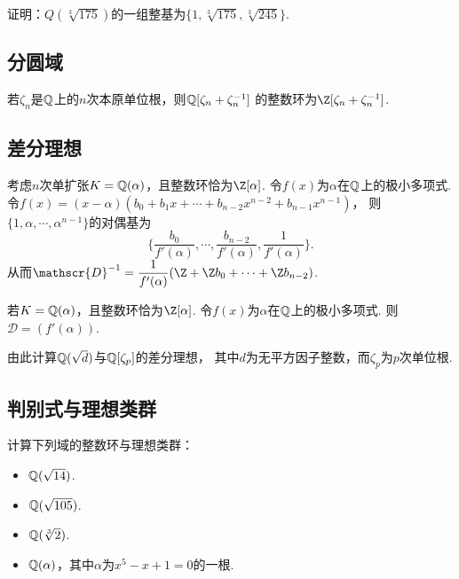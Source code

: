 \begin{exercise}
证明：$Q(\sqrt[3]{175})$的一组整基为$\{1,\sqrt[3]{175},\sqrt[3]{245}\}$.
\end{exercise}

\subsection{分圆域}
\begin{exercise}
    若$\zeta_{n}$是$\mathbb{Q}$上的$n$次本原单位根，则$\mathbb{Q}[\zeta_{n}+\zeta_{n}^{-1}]$
    的整数环为$\Z[\zeta_{n} + \zeta_{n}^{-1}]$.
\end{exercise}

\subsection{差分理想}

\begin{exercise}
    考虑$n$次单扩张$K = \mathbb{Q}(\alpha)$，且整数环恰为$\Z[\alpha]$.
    令$f(x)$为$\alpha$在$\mathbb{Q}$上的极小多项式.
    令$f(x) = (x-\alpha)(b_{0} + b_{1}x + \cdots +b_{n-2}x^{n-2} + b_{n-1}x^{n-1})$，
    则$\{1,\alpha,\cdots,\alpha^{n-1}\}$的对偶基为
    \[\{\frac{b_{0}}{f'(\alpha)},\cdots,\frac{b_{n-2}}{f'(\alpha)},\frac{1}{f'(\alpha)}\}.\]
    从而$\mathscr{D}^{-1} = \dfrac{1}{f'(\alpha)}(\Z + \Z b_{0} + \cdots + \Z b_{n-2})$.
\end{exercise}

\begin{exercise}
    若$K = \mathbb{Q}(\alpha)$，且整数环恰为$\Z[\alpha]$.
    令$f(x)$为$\alpha$在$\mathbb{Q}$上的极小多项式. 则$\mathscr{D} = (f'(\alpha))$.

    由此计算$\mathbb{Q}(\sqrt{d})$与$\mathbb{Q}[\zeta_{p}]$的差分理想，
    其中$d$为无平方因子整数，而$\zeta_{p}$为$p$次单位根.
\end{exercise}

\subsection{判别式与理想类群}
\begin{exercise}
    计算下列域的整数环与理想类群：
    \begin{itemize}
        \item $\mathbb{Q}(\sqrt{14})$.
        \item $\mathbb{Q}(\sqrt{105})$.
        \item $\mathbb{Q}(\sqrt[3]{2})$.
        \item $\mathbb{Q}(\alpha)$，其中$\alpha$为$x^{5}-x+1=0$的一根.
    \end{itemize}
\end{exercise}

